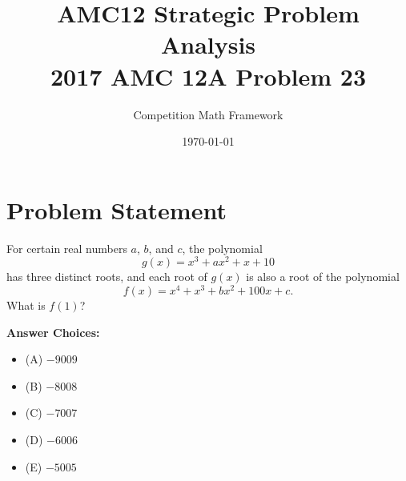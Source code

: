 \documentclass[]{article}
\begin{document}
\title{AMC12 Strategic Problem Analysis\\2017 AMC 12A Problem 23}
\author{Competition Math Framework}
\date{\today}
\maketitle

\section*{Problem Statement}

For certain real numbers $a$, $b$, and $c$, the polynomial
\[g(x) = x^3 + ax^2 + x + 10\]
has three distinct roots, and each root of $g(x)$ is also a root of the polynomial
\[f(x) = x^4 + x^3 + bx^2 + 100x + c.\]
What is $f(1)$?

\textbf{Answer Choices:} 
\begin{itemize}
    \item (A) $-9009$
    \item (B) $-8008$
    \item (C) $-7007$
    \item (D) $-6006$
    \item (E) $-5005$
\end{itemize}
\end{document}
